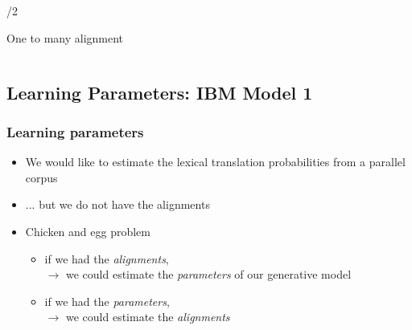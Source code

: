 \begin{frame}
\begin{columns}[t]
\begin{column}{\textwidth/2}
\begin{block}{One to many alignment \xmark}

\end{block}

\end{column}

\end{columns}

\end{frame}

\subsection{Learning Parameters: IBM Model 1}
\frame{\tableofcontents[currentsection]}

\begin{frame}
\frametitle{Learning parameters\koehnref}
\begin{itemize}[<+->]
\item We would like to estimate the lexical translation probabilities  from a parallel corpus
\item ... but we do not have the alignments
\item Chicken and egg problem
\begin{itemize}
\item if we had the {\em alignments},\\ $\rightarrow$ we could estimate the {\em parameters} of our generative model\\[-3mm]
\item if we had the {\em parameters},\\ $\rightarrow$ we could estimate the {\em alignments}
\end{itemize}
\end{itemize}

\end{frame}

